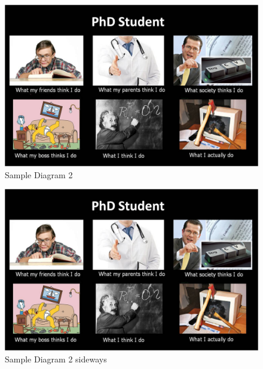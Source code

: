 \clearpage
\newpage


\begin{figure}[b]
	\centering
	\includegraphics[width=\linewidth]{images/phd.png}
	\caption{Sample Diagram 2}
	\label{diag:sample2}
\end{figure}

\clearpage
\newpage


\begin{figure}
	\centering
	\includegraphics[width=\linewidth]{images/phd.png}
	\caption{Sample Diagram 2 sideways}
	\label{diag:sample3}
\end{figure}


